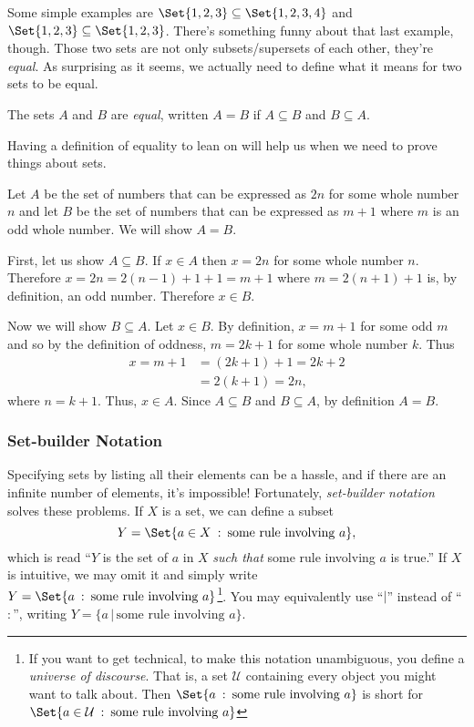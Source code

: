 	Some simple examples are $\Set{1,2,3}\subseteq \Set{1,2,3,4}$ and $\Set{1,2,3}\subseteq\Set{1,2,3}$.
	There's something funny about that last example, though.  Those two sets are not only subsets/supersets
	of each other, they're \emph{equal}.  As surprising as it seems, we actually need to define
	what it means for two sets to be equal.
	\begin{definition}
		The sets $A$ and $B$ are \emph{equal}, written $A=B$ if $A\subseteq B$ and $B\subseteq A$.
	\end{definition}
	Having a definition of equality to lean on will help us when we need to prove things about sets.

	\begin{example}
		Let $A$ be the set of numbers that can be expressed
		as $2n$ for some whole number $n$ and let $B$ be the
		set of numbers that can be expressed as $m+1$ where $m$ is
		an odd whole number.  We will show $A=B$.

		First, let us show $A\subseteq B$.  If $x\in A$ then $x=2n$
		for some whole number $n$.  Therefore $x=2n=2(n-1)+1+1=m+1$ where
		$m=2(n+1)+1$ is, by definition, an odd number.  Therefore $x\in B$.

		Now we will show $B\subseteq A$.  Let $x\in B$.  By definition,
		$x=m+1$ for some odd $m$ and so by the definition of oddness, $m=2k+1$
		for some whole number $k$.  Thus 
		\begin{align*}
			x=m+1&=(2k+1)+1=2k+2\\
			&=2(k+1)=2n,
		\end{align*} where $n=k+1$. Thus, $x\in A$.  Since $A\subseteq B$
		and $B\subseteq A$, by definition $A=B$.
	\end{example}
	

	\subsubsection{Set-builder Notation}
	Specifying sets by listing all their elements can be a hassle, and if there are an infinite
	number of elements, it's impossible!  Fortunately, \emph{set-builder notation}
	solves these problems.
	If $X$ is a set, we can define a subset 
	\[
		Y= \Set{a\in X\given\text{some rule involving }a},
	\]
	which is read ``$Y$ is the set of $a$ in $X$ \emph{such that} some rule
	involving $a$ is true.''  If $X$ is intuitive, we may omit it and
	simply write $Y=\Set{a\given\text{some rule involving }a}$\footnote{ If you want
	to get technical, to make this notation unambiguous, you define a 
	\emph{universe of discourse}.  That is, a set $\mathcal U$ containing
	every object you might want to talk about.  Then $\Set{a\given\text{some rule involving }a}$
	is short for $\Set{a\in\mathcal U\given\text{some rule involving }a}$}.  You may equivalently
	use ``$|$'' instead of ``$:$'', writing $Y=\{a\,|\,\text{some rule involving }a\}$.

